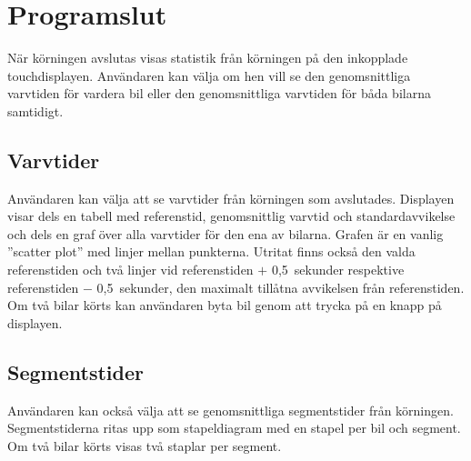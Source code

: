 \section{Programslut}
\label{sec:programslut}

När körningen avslutas visas statistik från körningen på den inkopplade
touchdisplayen. Användaren kan välja om hen vill se den genomsnittliga varvtiden
för vardera bil eller den genomsnittliga varvtiden för båda bilarna samtidigt.

\subsection{Varvtider}

Användaren kan välja att se varvtider från körningen som avslutades. Displayen
visar dels en tabell med referenstid, genomsnittlig varvtid och
standardavvikelse och dels en graf över alla varvtider för den ena av bilarna.
Grafen är en vanlig ''scatter plot'' med linjer mellan punkterna. Utritat finns
också den valda referenstiden och två linjer vid referenstiden $+$ 0,5~sekunder
respektive referenstiden $-$ 0,5~sekunder, den maximalt tillåtna avvikelsen från
referenstiden. Om två bilar körts kan användaren byta bil genom att trycka på en
knapp på displayen.

\subsection{Segmentstider}

Användaren kan också välja att se genomsnittliga segmentstider från körningen.
Segmentstiderna ritas upp som stapeldiagram med en stapel per bil och segment.
Om två bilar körts visas två staplar per segment.

